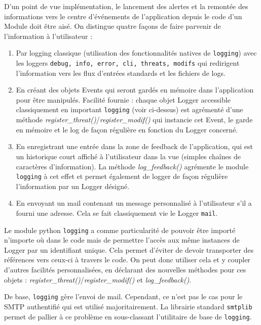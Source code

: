 \documentclass[]{article}
\begin{document}
\par D'un point de vue implémentation, le lancement des alertes et la remontée des informations vers le centre d’événements de l'application depuis le code d'un Module doit être aisé. On distingue quatre façons de faire parvenir de l'information à l'utilisateur :
\begin{enumerate}
\item Par logging classique (utilisation des fonctionnalités natives de \texttt{logging}) avec les loggers \texttt{debug, info, error, cli, threats, modifs} qui redirigent l'information vers les flux d'entrées standards et les fichiers de logs.
\vspace{0.1cm}
\item En créant des objets Events qui seront gardés en mémoire dans l'application pour être manipulés. Facilité fournie : chaque objet Logger accessible classiquement en important \texttt{logging} (voir ci-dessus) est agrémenté d'une méthode \textit{register\_threat()}/\textit{register\_modif()} qui instancie cet Event, le garde en mémoire et le log de façon régulière en fonction du Logger concerné.
\vspace{0.1cm}
\item En enregistrant une entrée dans la zone de feedback de l'application, qui est un historique court affiché à l'utilisateur dans la vue (simples chaînes de caractères d'information). La méthode \textit{log\_feedback()} agrémente le module \texttt{logging} à cet effet et permet également de logger de façon régulière l'information par un Logger désigné.
\vspace{0.1cm}
\item En envoyant un mail contenant un message personnalisé à l'utilisateur s'il a fourni une adresse. Cela se fait classiquement vie le Logger \texttt{mail}. 
\end{enumerate}
\vspace{0.1cm}
Le module python \texttt{logging} a comme particularité de pouvoir être importé n'importe où dans le code mais de permettre l'accès aux même instances de Logger par un identifiant unique. Cela permet d'éviter de devoir transporter des références vers ceux-ci à travers le code. On peut donc utiliser cela et y coupler d'autres facilités personnalisées, en déclarant des nouvelles méthodes pour ces objets : \textit{register\_threat()}/\textit{register\_modif()} et \textit{log\_feedback()}.\\

\par De base, \texttt{logging} gère l'envoi de mail. Cependant, ce n'est pas le cas pour le SMTP authentifié qui est utilisé majoritairement. La librairie standard \texttt{smtplib} permet de pallier à ce problème en sous-classant l'utilitaire de base de \texttt{logging}.
\end{document}
